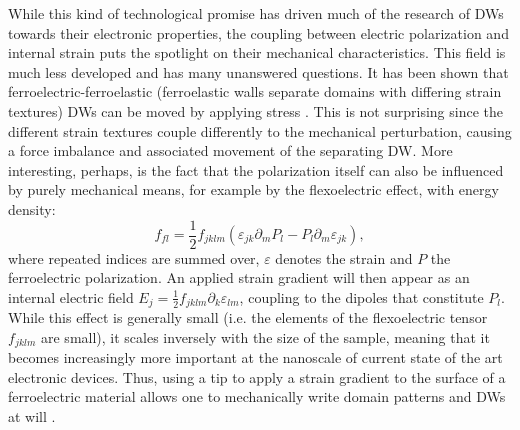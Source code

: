 While this kind of technological promise has driven much of the research of DWs towards their electronic properties, the coupling between electric polarization and internal strain puts the spotlight on their mechanical characteristics.
This field is much less developed and has many unanswered questions.
It has been shown that ferroelectric-ferroelastic (ferroelastic walls separate domains with differing strain textures) DWs can be moved by applying stress \cite{Schneider2001}.
This is not surprising since the different strain textures couple differently to the mechanical perturbation, causing a force imbalance and associated movement of the separating DW.
More interesting, perhaps, is the fact that the polarization itself can also be influenced by purely mechanical means, for example by the flexoelectric effect, with energy density:
\begin{equation}
	f_{fl} = \frac{1}{2}f_{jklm}(\varepsilon_{jk}\partial_mP_l-P_l\partial_m\varepsilon_{jk}),
\end{equation}
where repeated indices are summed over, $\varepsilon$ denotes the strain and $P$ the ferroelectric polarization.
An applied strain gradient will then appear as an internal electric field $E_{j} = \frac{1}{2}f_{jklm}\partial_k\varepsilon_{lm}$, coupling to the dipoles that constitute $P_l$.
While this effect is generally small (i.e. the elements of the flexoelectric tensor $f_{jklm}$ are small), it scales inversely with the size of the sample, meaning that it becomes increasingly more important at the nanoscale of current state of the art electronic devices.
Thus, using a tip to apply a strain gradient to the surface of a ferroelectric material allows one to mechanically write domain patterns and DWs at will \cite{Lu2012}.

